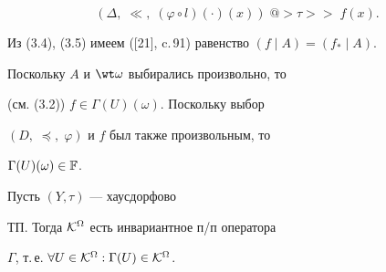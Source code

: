 \begin{pf}
\begin{equation}


(\Delta,\;\ll,\;


({\varphi} \circ l)(\cdot)(x))\;@>{\tau}>>\;{f(x)}.


\end{equation}


Из (3.4), (3.5) имеем ([21], c.\,91) равенство $(f \mid A) = ({f_*} \mid A)$.


Поскольку $A$ и $\wt \omega$ выбирались произвольно, то


(см. (3.2)) $f \in {\Gamma}(U)(\omega)$. Поскольку выбор


$(D,\;\preceq,\;\varphi)$ и $f$ был также произвольным, то


${\Gamma}(U)(\omega) \in {\Bbb F}$.


\end{pf}





\begin{props}


Пусть $(Y,\tau)$ --- хаусдорфово


ТП. Тогда ${\cal K}^{\Omega}$ есть инвариантное п/п оператора


$\Gamma$, т.\,е. $\forall{U} \in {{\cal K}^{\Omega}}:


{{\Gamma}(U)} \in {{\cal K}^{\Omega}}$.


\end{props}





